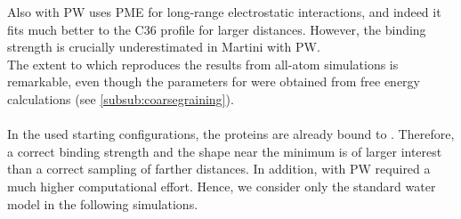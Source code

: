 Also \martini{} with PW uses PME for long-range electrostatic interactions, and indeed it fits much better to the C36 profile for larger distances. However, the binding strength is crucially underestimated in Martini with PW.\\
The extent to which \martini{} reproduces the results from all-atom simulations is remarkable, even though the parameters for \martini{} were obtained from free energy calculations (see \autoref{subsub:coarsegraining}).\\
\\
In the used starting configurations, the proteins are already bound to \pip{}. Therefore, a correct binding strength and the shape near the minimum is of larger interest than a correct sampling of farther distances. In addition, \martini{} with PW required a much higher computational effort. Hence, we consider only the standard water model in the following simulations.
